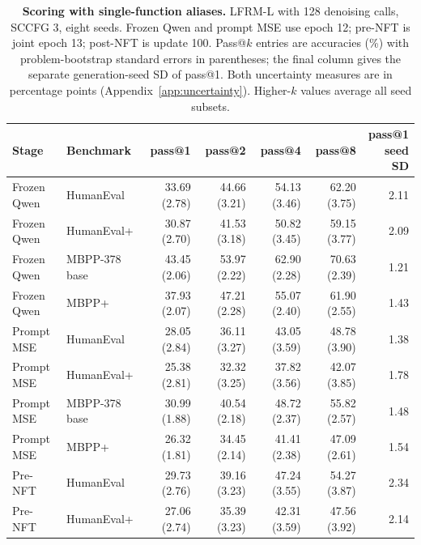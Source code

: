 \documentclass{article}
\begin{document}
\begin{table}[htbp]
\centering\small
\setlength{\tabcolsep}{3pt}
\caption{\textbf{Scoring with single-function aliases.} LFRM-L with 128 denoising calls, SCCFG 3, eight seeds. Frozen Qwen and prompt MSE use epoch 12; pre-NFT is joint epoch 13; post-NFT is update 100. Pass@$k$ entries are accuracies (\%) with problem-bootstrap standard errors in parentheses; the final column gives the separate generation-seed SD of pass@1. Both uncertainty measures are in percentage points (Appendix~\ref{app:uncertainty}). Higher-$k$ values average all seed subsets.}
\label{tab:codingaliasdetail}
\begin{tabular}{@{}llrrrrr@{}}
\toprule
Stage & Benchmark & pass@1 & pass@2 & pass@4 & pass@8 & \shortstack{pass@1\\seed SD}\\
\midrule
Frozen Qwen & HumanEval & 33.69 {\scriptsize (2.78)} & 44.66 {\scriptsize (3.21)} & 54.13 {\scriptsize (3.46)} & 62.20 {\scriptsize (3.75)} & 2.11\\
Frozen Qwen & HumanEval+ & 30.87 {\scriptsize (2.70)} & 41.53 {\scriptsize (3.18)} & 50.82 {\scriptsize (3.45)} & 59.15 {\scriptsize (3.77)} & 2.09\\
Frozen Qwen & MBPP-378 base & 43.45 {\scriptsize (2.06)} & 53.97 {\scriptsize (2.22)} & 62.90 {\scriptsize (2.28)} & 70.63 {\scriptsize (2.39)} & 1.21\\
Frozen Qwen & MBPP+ & 37.93 {\scriptsize (2.07)} & 47.21 {\scriptsize (2.28)} & 55.07 {\scriptsize (2.40)} & 61.90 {\scriptsize (2.55)} & 1.43\\
\midrule
Prompt MSE & HumanEval & 28.05 {\scriptsize (2.84)} & 36.11 {\scriptsize (3.27)} & 43.05 {\scriptsize (3.59)} & 48.78 {\scriptsize (3.90)} & 1.38\\
Prompt MSE & HumanEval+ & 25.38 {\scriptsize (2.81)} & 32.32 {\scriptsize (3.25)} & 37.82 {\scriptsize (3.56)} & 42.07 {\scriptsize (3.85)} & 1.78\\
Prompt MSE & MBPP-378 base & 30.99 {\scriptsize (1.88)} & 40.54 {\scriptsize (2.18)} & 48.72 {\scriptsize (2.37)} & 55.82 {\scriptsize (2.57)} & 1.48\\
Prompt MSE & MBPP+ & 26.32 {\scriptsize (1.81)} & 34.45 {\scriptsize (2.14)} & 41.41 {\scriptsize (2.38)} & 47.09 {\scriptsize (2.61)} & 1.54\\
\midrule
Pre-NFT & HumanEval & 29.73 {\scriptsize (2.76)} & 39.16 {\scriptsize (3.23)} & 47.24 {\scriptsize (3.55)} & 54.27 {\scriptsize (3.87)} & 2.34\\
Pre-NFT & HumanEval+ & 27.06 {\scriptsize (2.74)} & 35.39 {\scriptsize (3.23)} & 42.31 {\scriptsize (3.59)} & 47.56 {\scriptsize (3.92)} & 2.14\\

\end{tabular}
\end{table}
\end{document}
